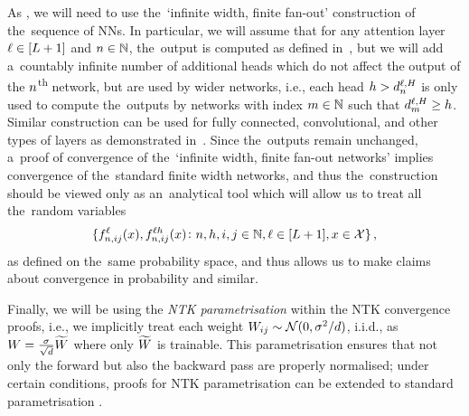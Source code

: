 As \citet{matthews2018gaussian}, we will need to use the~`infinite width, finite fan-out' construction of the~sequence of NNs.
In particular, we will assume that for any attention layer $\ell \in [L + 1]$ and $n \in \mathbb{N}$, the~output is computed as defined in~, but we will add a~countably infinite number of additional heads which do not affect the output of the $n$\textsuperscript{th} network, but are used by wider networks,
i.e., each head $h > d_{n}^{\ell, H}$ is only used to compute the~outputs by networks with index $m \in \mathbb{N}$ such that $d_{m}^{\ell,H} \geq h$.
Similar construction can be used for fully connected, convolutional, and other types of layers as demonstrated in~\citep{matthews2018gaussian,garriga2019deep}.
Since the~outputs remain unchanged, a~proof of convergence of the~`infinite width, finite fan-out networks' implies convergence of the~standard finite width networks, and thus the~construction should be viewed only as an~analytical tool which will allow us to treat all the~random variables
\begin{equation*}
    \{
        {f}^{\ell}_{n, ij}{(x)}, {f}^{\ell h}_{n, ij}{(x)}
        \colon
        n, h, i, j \in \mathbb{N}, \ell \in [L + 1], x \in \mathcal{X}
    \}
    \, ,
\end{equation*}
as defined on the~same probability space, and thus allows us to make claims about convergence in probability and similar.

Finally, we will be using the \emph{NTK parametrisation} \citep{jacot2018ntk} within the NTK convergence proofs, i.e., we implicitly treat each weight $W_{ij} \sim \mathcal{N}(0, \sigma^2 / d)$, i.i.d., as $W = \frac{\sigma}{\sqrt{d}} \widetilde{W}$ where only $\widetilde{W}$ is trainable.
This parametrisation ensures that not only the forward but also the backward pass are properly normalised; under certain conditions, proofs for NTK parametrisation can be extended to standard parametrisation \citep{lee2019wide}.

